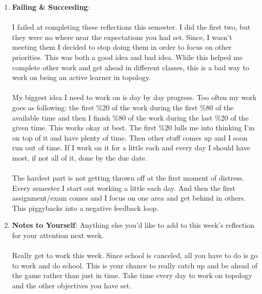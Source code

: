 \documentclass[10pt]{article}
\begin{document}
\begin{enumerate}
\item {\large {\bf Failing \& Succeeding}}:\\
\\
I failed at completing these reflections this semester. I did the first two, but they were no where near the expectations you had set. Since, I wasn't meeting them I decided to stop doing them in order to focus on other priorities. This was both a good idea and bad idea. While this helped me complete other work and get ahead in different classes, this is a bad way to work on being an active learner in topology.\\
\\
My biggest idea I need to work on is day by day progress. Too often my work goes as following: the first \%20 of the work during the first \%80 of the available time and then I finish \%80 of the work during the last \%20 of the given time. This works okay at best. The first \%20 lulls me into thinking I'm on top of it and have plenty of time. Then other stuff comes up and  I soon run out of time. If I work on it for a little each and every day I should have most, if not all of it, done by the due date. \\
\\
The hardest part is not getting thrown off at the first moment of distress. Every semester I start out working a little each day. And then the first assignment/exam comes and I focus on one area and get behind in others. This piggybacks into a negative feedback loop.
\\
\item {\large {\bf Notes to Yourself}}: Anything else you'd like to add to this week's reflection for your attention next week.\\
\\
Really get to work this week. Since school is canceled, all you have to do is go to work and do school. This is your chance to really catch up and be ahead of the game rather than just in time. Take time every day to work on topology and the other objectives you have set.
\end{enumerate}
\end{document}

